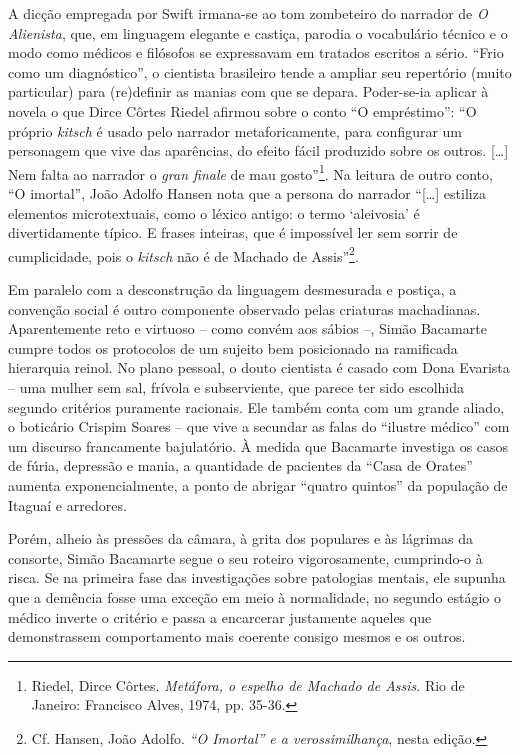 A dicção empregada por Swift irmana-se ao tom zombeteiro do narrador de
\emph{O Alienista}, que, em linguagem elegante e castiça, parodia o
vocabulário técnico e o modo como médicos e filósofos se expressavam em
tratados escritos a sério. ``Frio como um diagnóstico'', o cientista
brasileiro tende a ampliar seu repertório (muito particular) para
(re)definir as manias com que se depara. Poder-se-ia aplicar à novela o
que Dirce Côrtes Riedel afirmou sobre o conto ``O empréstimo'': ``O
próprio \emph{kitsch} é usado pelo narrador metaforicamente, para
configurar um personagem que vive das aparências, do efeito fácil
produzido sobre os outros. {[}\ldots{}{]} Nem falta ao narrador o
\emph{gran finale} de mau gosto''\footnote{Riedel, Dirce Côrtes.
  \emph{Metáfora, o espelho de Machado de Assis}. Rio de Janeiro:
  Francisco Alves, 1974, pp. 35-36.}. Na leitura de outro conto, ``O
imortal'', João Adolfo Hansen nota que a persona do narrador
``{[}\ldots{}{]} estiliza elementos microtextuais, como o léxico antigo:
o termo `aleivosia' é divertidamente típico. E frases inteiras, que é
impossível ler sem sorrir de cumplicidade, pois o \emph{kitsch} não é de
Machado de Assis''\footnote{Cf. Hansen, João Adolfo. \emph{``O Imortal''
  e a verossimilhança}, nesta edição.}.

Em paralelo com a desconstrução da linguagem desmesurada e postiça, a
convenção social é outro componente observado pelas criaturas
machadianas. Aparentemente reto e virtuoso -- como convém aos sábios --,
Simão Bacamarte cumpre todos os protocolos de um sujeito bem posicionado
na ramificada hierarquia reinol. No plano pessoal, o douto cientista é
casado com Dona Evarista -- uma mulher sem sal, frívola e subserviente,
que parece ter sido escolhida segundo critérios puramente racionais. Ele
também conta com um grande aliado, o boticário Crispim Soares -- que
vive a secundar as falas do ``ilustre médico'' com um discurso
francamente bajulatório. À medida que Bacamarte investiga os casos de
fúria, depressão e mania, a quantidade de pacientes da ``Casa de
Orates'' aumenta exponencialmente, a ponto de abrigar ``quatro quintos''
da população de Itaguaí e arredores.

Porém, alheio às pressões da câmara, à grita dos populares e às lágrimas
da consorte, Simão Bacamarte segue o seu roteiro vigorosamente,
cumprindo-o à risca. Se na primeira fase das investigações sobre
patologias mentais, ele supunha que a demência fosse uma exceção em meio
à normalidade, no segundo estágio o médico inverte o critério e passa a
encarcerar justamente aqueles que demonstrassem comportamento mais
coerente consigo mesmos e os outros.

